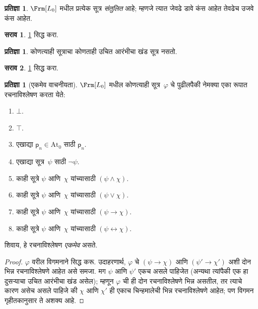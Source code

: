 \documentclass[11pt,a4paper,openany]{book}
\theoremstyle{definition}
\newtheorem{prop}[defn]{प्रतिज्ञा}
\newtheorem{prob}{सराव}[chapter]
\newcommand{\lif}{\mathbin{\to}}
\newcommand{\liff}{\mathbin{\leftrightarrow}}
\newcommand{\Obj}[1]{\mathsf{#1}}
\newcommand{\PVar}{\mathrm{At}_0}
\newcommand{\lfalse}{\bot}
\newcommand{\ltrue}{\top}
\begin{document}
\begin{prop}\label{pl:syn:pre:prop:balanced}
   $\Frm[L_0]$ मधील प्रत्येक सूत्र \emph{संतुलित} आहे; म्हणजे
   त्यात जेवढे डावे कंस आहेत तेवढेच उजवे कंस आहेत.
\end{prop}

\begin{prob}
\ref{pl:syn:pre:prop:balanced} सिद्ध करा.
\end{prob}

\begin{prop} \label{pl:syn:pre:prop:noinit}
कोणत्याही सूत्राचा कोणताही उचित आरंभीचा खंड सूत्र नसतो.
\end{prop}

\begin{prob}
  \ref{pl:syn:pre:prop:noinit} सिद्ध करा.
\end{prob}

\begin{prop}[एकमेव वाचनीयता]
$ \Frm[L_0]$ मधील कोणत्याही सूत्र~$\varphi$ चे पुढीलपैकी नेमक्या एका
रूपात रचनाविश्लेषण करता येते:
\begin{enumerate}
\item $\lfalse$.

\item $\ltrue$.

\item एखाद्या $\Obj p_n \in  \PVar$ साठी $\Obj p_n$.

\item एखाद्या सूत्र~$\psi$ साठी $\lnot \psi$.

\item काही सूत्रे $\psi$ आणि~$\chi$ यांच्यासाठी
  $(\psi \land \chi)$.

\item काही सूत्रे $\psi$ आणि~$\chi$ यांच्यासाठी
  $(\psi \lor \chi)$.

\item काही सूत्रे $\psi$ आणि~$\chi$ यांच्यासाठी
  $(\psi \lif \chi)$.

\item काही सूत्रे $\psi$ आणि~$\chi$ यांच्यासाठी
  $(\psi \liff \chi)$.
\end{enumerate}
शिवाय, हे रचनाविश्लेषण \emph{एकमेव} असते.
\end{prop}

\begin{proof}
$\varphi$ वरील विगमनाने सिद्ध करू. उदाहरणार्थ, $\varphi$ चे $(\psi \lif \chi)$ आणि
$(\psi' \lif \chi')$ अशी दोन भिन्न रचनाविश्लेषणे आहेत असे समजा. मग $\psi$
आणि $\psi'$ एकच असले पाहिजेत (अन्यथा त्यांपैकी एक हा दुसऱ्याचा उचित
आरंभीचा खंड असेल); म्हणून $\varphi$ ची ही दोन रचनाविश्लेषणे भिन्न असतील,
तर त्याचे कारण असेच असले पाहिजे की $\chi$ आणि $\chi'$ ही एकाच
चिन्हमालेची भिन्न रचनाविश्लेषणे आहेत; पण विगमन गृहीतकानुसार ते अशक्य
आहे.
\end{proof}
\end{document}
